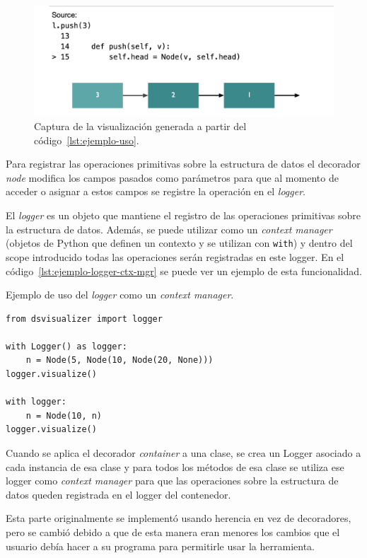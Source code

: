 \begin{figure}[htb]
    \centering
    \includegraphics[width=\linewidth]{imagenes/ejemplos/ejemplo}
    \caption{Captura de la visualización generada a partir del código~\ref{lst:ejemplo-uso}.}
    \label{fig:visualizacion_ej}
    \centering
\end{figure}

Para registrar las operaciones primitivas sobre la estructura de datos el decorador \textit{node} modifica los campos pasados como parámetros para que al momento de acceder o asignar a estos campos se registre la operación en el \textit{logger}.

El \textit{logger} es un objeto que mantiene el registro de las operaciones primitivas sobre la estructura de datos. Además, se puede utilizar como un \textit{context manager} (objetos de Python que definen un contexto y se utilizan con \texttt{with}) y dentro del scope introducido todas las operaciones serán registradas en este logger. En el código~\ref{lst:ejemplo-logger-ctx-mgr} se puede ver un ejemplo de esta funcionalidad.

\begin{listing}[htb]
\caption{Ejemplo de uso del \textit{logger} como un \textit{context manager}.}
\label{lst:ejemplo-logger-ctx-mgr}
\begin{verbatim}
from dsvisualizer import logger

with Logger() as logger:
    n = Node(5, Node(10, Node(20, None)))
logger.visualize()

with logger:
    n = Node(10, n)
logger.visualize()
\end{verbatim}
\end{listing}

Cuando se aplica el decorador \textit{container} a una clase, se crea un Logger asociado a cada instancia de esa clase y para todos los métodos de esa clase se utiliza ese logger como \textit{context manager} para que las operaciones sobre la estructura de datos queden registrada en el logger del contenedor.

Esta parte originalmente se implementó usando herencia en vez de decoradores, pero se cambió debido a que de esta manera eran menores los cambios que el usuario debía hacer a su programa para permitirle usar la herramienta.
